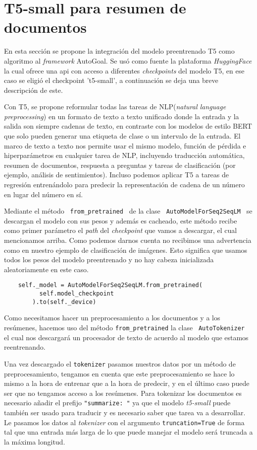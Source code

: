 \section{T5-small para resumen de documentos}
En esta sección se propone la integración del modelo preentrenado T5 como algoritmo al \textit{framework} AutoGoal. Se usó como fuente la plataforma \textit{HuggingFace} la cual ofrece una api con acceso a diferentes \textit{checkpoints} del modelo T5, en ese caso se eligió el checkpoint 't5-small', a continuación se deja una breve descripción de este.

Con T5, se propone reformular todas las tareas de NLP(\textit{natural language preprocessing}) en un formato de texto a texto unificado donde la entrada y la salida son siempre cadenas de texto, en contraste con los modelos de estilo BERT que solo pueden generar una etiqueta de clase o un intervalo de la entrada. El marco de texto a texto nos permite usar el mismo modelo, función de pérdida e hiperparámetros en cualquier tarea de NLP, incluyendo traducción automática, resumen de documentos, respuesta a preguntas y tareas de clasificación (por ejemplo, análisis de sentimientos). Incluso podemos aplicar T5 a tareas de regresión entrenándolo para predecir la representación de cadena de un número en lugar del número en sí.

Mediante el método \texttt{ from\_pretrained } de  la clase \texttt{ AutoModelForSeq2SeqLM } se descargan el modelo con sus pesos y además es cacheado, este método recibe como primer parámetro el \textit{path} del \textit{checkpoint} que vamos a descargar, el cual mencionamos arriba. Como podemos darnos cuenta no recibimos una advertencia como en nuestro ejemplo de clasificación de imágenes. Esto significa que usamos todos los pesos del modelo preentrenado y no hay cabeza inicializada aleatoriamente en este caso.

\begin{verbatim}
    self._model = AutoModelForSeq2SeqLM.from_pretrained(
          self.model_checkpoint
        ).to(self._device)
\end{verbatim}

Como necesitamos hacer un preprocesamiento a los documentos y a los resúmenes, hacemos uso del método \texttt{from\_pretrained} la clase \texttt{ AutoTokenizer } el cual nos descargará un procesador de texto de acuerdo al modelo que estamos reentrenando.

Una vez descargado el \texttt{tokenizer} pasamos nuestros datos por un método de preprocesamiento, tengamos en cuenta que este preprocesamiento se hace lo mismo a la hora de entrenar que a la hora de predecir, y en el último caso puede ser que no tengamos acceso a los resúmenes. Para tokenizar los documentos es necesario añadir el prefijo \texttt{"summarize: "} ya que el modelo \textit{t5-small} puede también ser usado para traducir y es necesario saber que tarea va a desarrollar. Le pasamos los datos al \textit{tokenizer} con el argumento \texttt{truncation=True} de forma tal que una entrada más larga de lo que puede manejar el modelo será truncada a la máxima longitud.


